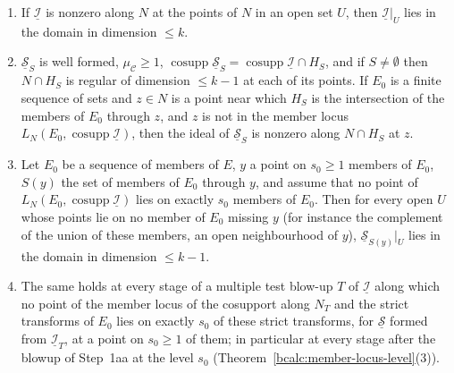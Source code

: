 \begin{proposition}
\begin{enumerate}
\item If \(\underline{\mathcal I}\) is nonzero along \(N\) at the points of \(N\) in an open set \(U\), then \(\underline{\mathcal I}|_U\) lies in the domain in dimension \(\le k\).
\item \(\underline{\mathcal S}_S\) is well formed, \(\mu_{\mathcal C}\ge1\), \(\operatorname{cosupp}\underline{\mathcal S}_S=\operatorname{cosupp}\underline{\mathcal I}\cap H_S\), and if \(S\ne\emptyset\)
then \(N\cap H_S\) is regular of dimension \(\le k-1\) at each of its points. If \(E_0\) is a finite sequence of sets and \(z\in N\) is a point near which \(H_S\) is the
intersection of the members of \(E_0\) through \(z\), and \(z\) is not in the member locus \(L_N(E_0,\operatorname{cosupp}\underline{\mathcal I})\), then the ideal of
\(\underline{\mathcal S}_S\) is nonzero along \(N\cap H_S\) at \(z\).
\item Let \(E_0\) be a sequence of members of \(E\), \(y\) a point on \(s_0\ge1\) members of \(E_0\), \(S(y)\) the set of members of \(E_0\) through \(y\), and assume that no point
of \(L_N(E_0,\operatorname{cosupp}\underline{\mathcal I})\) lies on exactly \(s_0\) members of \(E_0\). Then for every open \(U\) whose points lie on no member of \(E_0\) missing \(y\)
(for instance the complement of the union of these members, an open neighbourhood of \(y\)), \(\underline{\mathcal S}_{S(y)}|_U\) lies in the domain in dimension \(\le k-1\).
\item The same holds at every stage of a multiple test blow-up \(T\) of \(\underline{\mathcal I}\) along which no point of the member locus of the cosupport along \(N_T\) and the
strict transforms of \(E_0\) lies on exactly \(s_0\) of these strict transforms, for \(\underline{\mathcal S}\) formed from \(\underline{\mathcal I}_T\), at a point on \(s_0\ge1\) of
them; in particular at every stage after the blowup of Step~1aa at the level \(s_0\) (Theorem~\ref{bcalc:member-locus-level}(3)).
\end{enumerate}
\end{proposition}

